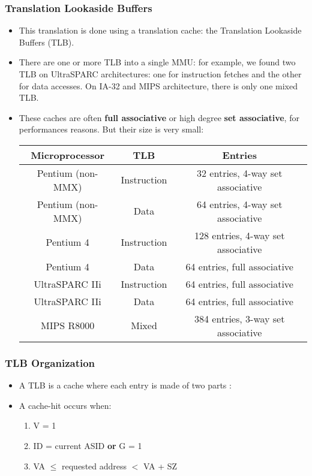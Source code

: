 \begin{frame}
  \frametitle{Translation Lookaside Buffers}

  \begin{itemize}
    \item
    This translation is done using a translation cache: the
    Translation Lookaside Buffers (TLB).
    \item
    There are one or more TLB into a single MMU: for example, we
    found two TLB on UltraSPARC architectures: one for instruction
    fetches and the other for data accesses. On IA-32 and MIPS
    architecture, there is only one mixed TLB.
    \item
    These caches are often \textbf{full associative} or high degree
    \textbf{set associative}, for performances reasons. But their size
    is very small:
    \begin{tabular}{|c|c|c|}
    \hline
    Microprocessor & TLB & Entries \\
    \hline
    Pentium (non-MMX) & Instruction & 32 entries, 4-way set associative \\
    \hline
    Pentium (non-MMX) & Data & 64 entries, 4-way set associative \\
    \hline
    Pentium 4 & Instruction & 128 entries, 4-way set associative \\
    \hline
    Pentium 4 & Data & 64 entries, full associative \\
    \hline
    UltraSPARC IIi & Instruction & 64 entries, full associative \\
    \hline
    UltraSPARC IIi & Data & 64 entries, full associative \\
    \hline
    MIPS R8000 & Mixed & 384 entries, 3-way set associative \\
    \hline
    \end{tabular}
  \end{itemize}
\end{frame}


\begin{frame}
  \frametitle{TLB Organization}

    \begin{itemize}
      \item A TLB is a cache where each entry is made of two parts :

      \begin{center}
      \end{center}

      \item A cache-hit occurs when:
      \begin{enumerate}
      \item
        V = 1
      \item
        ID = current ASID \textbf{or} G = 1
      \item
        VA $\leq$ requested address $<$ VA + SZ
      \end{enumerate}
    \end{itemize}
\end{frame}

